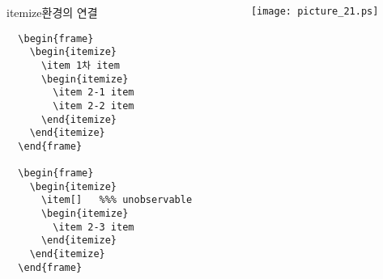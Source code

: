 \documentclass[hyperref={unicode}]{beamer}
\begin{document}
\begin{frame}[fragile]

\begin{columns}[c]
\begin{column}{0.5\textwidth}
\begin{block}{itemize환경의 연결}
\tiny
\begin{center}
\begin{verbatim}
  \begin{frame}
    \begin{itemize}
      \item 1차 item
      \begin{itemize}
        \item 2-1 item
        \item 2-2 item 
      \end{itemize}
    \end{itemize}
  \end{frame}

  \begin{frame}
    \begin{itemize}
      \item[]   %%% unobservable 
      \begin{itemize}
        \item 2-3 item
      \end{itemize}
    \end{itemize}
  \end{frame}
\end{verbatim}
\end{center}
\end{block}
\end{column}

\begin{column}{0.5\textwidth}
\begin{center}
	\texttt{[image: picture\_21.ps]}
\end{center}
\end{column}

\end{columns}

\end{frame}

\end{document}
